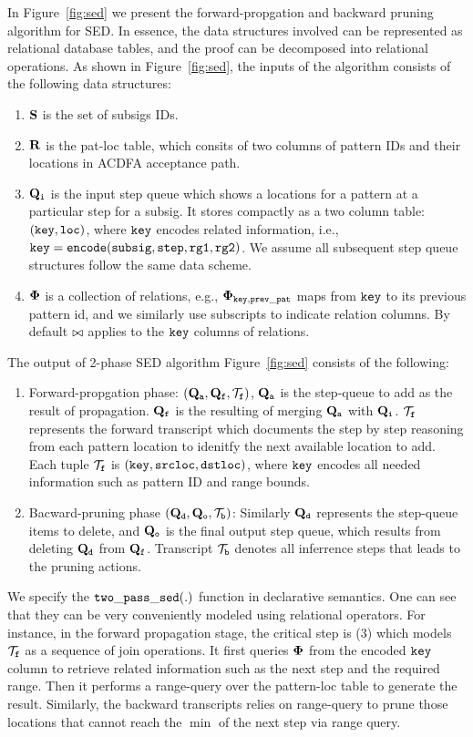 In Figure\ \ref{fig:sed} we present the forward-propgation and backward
pruning algorithm for SED. In essence, the 
data structures involved can be represented as
relational database tables, and the proof can be decomposed into
relational operations. As shown in Figure\ \ref{fig:sed},
the inputs of the algorithm consists of the following data
structures:
\begin{enumerate}
\item ${{\mathbf {S}}}$ is the set of subsigs IDs. 
\item ${{\mathbf {R}}}$ is the pat-loc table, which consits of two columns of
pattern IDs and their locations in ACDFA acceptance path.
\item ${{{\mathbf {Q}}}}_{\texttt{i}}$ is the input step queue which shows
	a locations for a pattern at a particular step
	for a subsig. It stores compactly as a two column
	table: $(\texttt{key},\texttt{loc})$, where $\texttt{key}$ encodes related
	information, i.e., $\texttt{key} = \texttt{encode}(\texttt{subsig}, \texttt{step}, \texttt{rg1}, \texttt{rg2})$. 
	We assume all subsequent step queue structures follow the
	same data scheme.
\item ${\bf \Phi}$ is a collection of relations, e.g.,
	${\bf \Phi}_{{\tt key,prev\_pat}}$ maps from ${\tt key}$
	to its previous pattern id, and we similarly
	use subscripts to indicate relation columns.
	By default $\bowtie$ applies to the $\texttt{key}$ columns of relations.
\end{enumerate}

The output of 2-phase SED algorithm Figure\ \ref{fig:sed}
consists of the following:
\begin{enumerate}
 \item Forward-propgation phase: 
	$({{{\mathbf {Q}}}}_{\texttt{a}}, {{{\mathbf {Q}}}}_{\texttt{f}}, {{\mathbf {{\mathcal T}}}}_{\texttt{f}})$,  ${{{\mathbf {Q}}}}_{\texttt{a}}$
	is the step-queue to add as the result of
	propagation. ${{{\mathbf {Q}}}}_{\texttt{f}}$ is the resulting of merging
	${{{\mathbf {Q}}}}_{\texttt{a}}$ with ${{{\mathbf {Q}}}}_{\texttt{i}}$. ${{\mathbf {{\mathcal T}}}}_{\texttt{f}}$ represents
	the forward transcript which documents the step by
	step reasoning from each pattern location to idenitfy
	the next available location to add.
	Each tuple ${{\mathbf {{\mathcal T}}}}_{\texttt{f}}$ is $(\texttt{key}, \texttt{srcloc}, \texttt{dstloc})$,
	where $\texttt{key}$ encodes all needed information such
	as pattern ID and range bounds.
\item Bacward-pruning phase
	$({{{\mathbf {Q}}}}_{\texttt{d}}, {{{\mathbf {Q}}}}_{\texttt{o}}, {{\mathbf {{\mathcal T}}}}_{\texttt{b}})$:
	Similarly ${{{\mathbf {Q}}}}_{\texttt{d}}$ represents the step-queue items to
	delete, and ${{{\mathbf {Q}}}}_{\texttt{o}}$ is the final output step queue,
	which results from deleting ${{{\mathbf {Q}}}}_{\texttt{d}}$ from 
	${{{\mathbf {Q}}}}_{\texttt{f}}$. Transcript ${{\mathbf {{\mathcal T}}}}_{\texttt{b}}$ denotes
	all inferrence steps that leads to the pruning actions.
\end{enumerate}

We specify the ${\tt two\_pass\_sed(.)}$ function in declarative
semantics. One can see that they can be very conveniently modeled
using relational operators. For instance, in the
forward propagation stage, the critical step is (3) which
models ${{\mathbf {{\mathcal T}}}}_{\texttt{f}}$ as a sequence of join operations.
It first queries ${\bf \Phi}$ from the encoded $\texttt{key}$ column to
retrieve related information such as the next step and the
required range. Then it performs a range-query over the
pattern-loc table to generate the result. Similarly,
the backward transcripts relies on range-query to prune
those locations that cannot reach the $\min$ of the next step
via range query.

